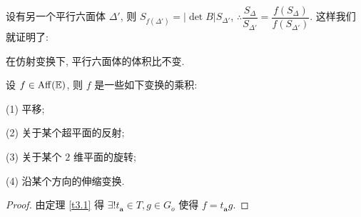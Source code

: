 \documentclass{ctexart}
\begin{document}
设有另一个平行六面体 $\Delta'$, 则 $S_{f(\Delta')}=|\det B|S_{\Delta'}$, $\therefore\dfrac{S_{\Delta}}{S_{\Delta'}}=\dfrac{f(S_{\Delta})}{f(S_{\Delta'})}$. 这样我们就证明了:
\begin{theorem}
    在仿射变换下, 平行六面体的体积比不变.
\end{theorem}
\begin{theorem}[书上的定理 11]
    设 $f\in\operatorname{Aff} (\mathbb{E})$, 则 $f$ 是一些如下变换的乘积:

    (1) 平移;
    
    (2) 关于某个超平面的反射;

    (3) 关于某个 $2$ 维平面的旋转;

    (4) 沿某个方向的伸缩变换.
\end{theorem}
\begin{proof}
    由定理 \ref{t3.1} 得 $\exists!t_{\boldsymbol{a}}\in T,g\in G_{\dot{o}}$ 使得 $f=t_{\boldsymbol{a}}g$.


\end{proof}
\end{document}
